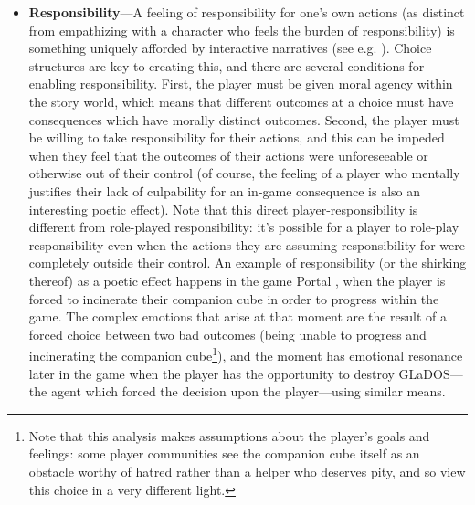 \begin{itemize}
\item \textbf{Responsibility}---A feeling of responsibility for one's own actions (as distinct from empathizing with a character who feels the burden of responsibility) is something uniquely afforded by interactive narratives (see e.g. \citep{Murphy2013}).
%
Choice structures are key to creating this, and there are several conditions for enabling responsibility.
%
First, the player must be given moral agency within the story world, which means that different outcomes at a choice must have consequences which have morally distinct outcomes.
%
Second, the player must be willing to take responsibility for their actions, and this can be impeded when they feel that the outcomes of their actions were unforeseeable or otherwise out of their control (of course, the feeling of a player who mentally justifies their lack of culpability for an in-game consequence is also an interesting poetic effect).
%
Note that this direct player-responsibility is different from role-played responsibility: it's possible for a player to role-play responsibility even when the actions they are assuming responsibility for were completely outside their control.
%
An example of responsibility (or the shirking thereof) as a poetic effect happens in the game Portal \citep{Portal}, when the player is forced to incinerate their companion cube in order to progress within the game.
%
The complex emotions that arise at that moment are the result of a forced choice between two bad outcomes (being unable to progress and incinerating the companion cube\footnote{Note that this analysis makes assumptions about the player's goals and feelings: some player communities see the companion cube itself as an obstacle worthy of hatred rather than a helper who deserves pity, and so view this choice in a very different light.}), and the moment has emotional resonance later in the game when the player has the opportunity to destroy GLaDOS---the agent which forced the decision upon the player---using similar means.



\end{itemize}
